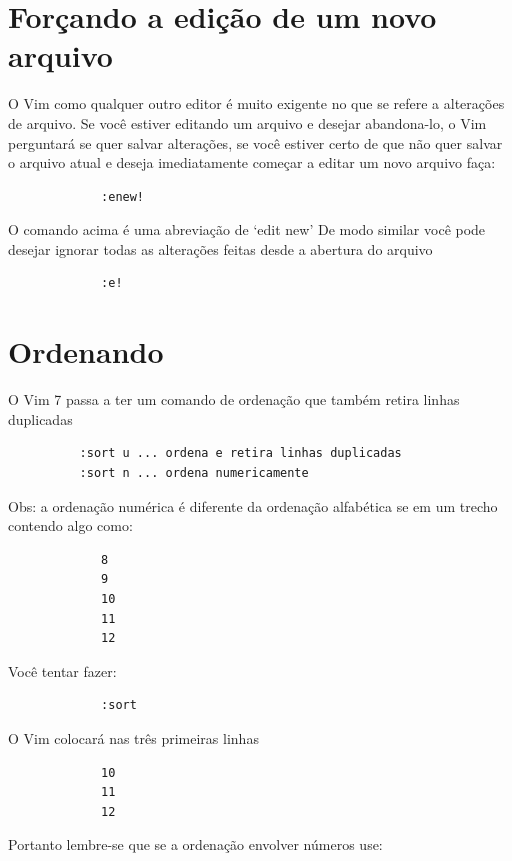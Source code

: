 \documentclass[10pt,a4paper,openany]{book}
\begin{document}
\section{Forçando a edição de um novo arquivo}\label{sec:Forçando a edição de um novo arquivo}

O Vim como qualquer outro editor é muito exigente no que se refere a alterações
de arquivo.  Se você estiver editando um arquivo e desejar abandona-lo, o Vim
perguntará se quer salvar alterações, se você estiver certo de que não quer
salvar o arquivo atual e deseja imediatamente começar a editar um novo arquivo
faça:

\begin{verbatim}
			 :enew!
\end{verbatim}

O comando acima é uma abreviação de `edit new' De modo similar você pode
desejar ignorar todas as alterações feitas desde a abertura do arquivo

\begin{verbatim}
			 :e!
\end{verbatim}


\section{Ordenando}

O Vim 7 passa a ter um comando de ordenação que também retira linhas
duplicadas

\begin{verbatim}
		  :sort u ... ordena e retira linhas duplicadas
		  :sort n ... ordena numericamente
\end{verbatim}

Obs: a ordenação numérica é diferente da ordenação alfabética se em um
trecho contendo algo como:

\begin{verbatim}
			 8
			 9
			 10
			 11
			 12
\end{verbatim}

Você tentar fazer:

\begin{verbatim}
			 :sort
\end{verbatim}

O Vim colocará nas três primeiras linhas

\begin{verbatim}
			 10
			 11
			 12
\end{verbatim}

Portanto lembre-se que se a ordenação envolver números use:
\end{document}

